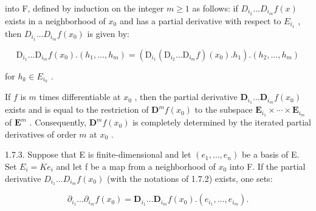 into F, defined by induction on the integer \(m \geqslant 1\) as follows: if \(D_{i_{2}} \ldots D_{i_{m}} f(x)\) exists in a neighborhood of \(x_{0}\) and has a partial derivative with respect to \(E_{i_{1}}\) , then \(D_{i_{1}} \ldots D_{i_{m}} f(x_{0})\) is given by:

\[
\mathrm{D} _ {i _ {1}} \dots \mathrm{D} _ {i _ {m}} f (x _ {0}). (h _ {1}, \dots , h _ {m}) = (\mathrm{D} _ {i _ {1}} (\mathrm{D} _ {i _ {2}} \dots \mathrm{D} _ {i _ {m}} f) (x _ {0}). h _ {1}). (h _ {2}, \dots , h _ {m})
\]

for \(h_{k} \in E_{i_{k}}\) .

If \(f\) is \(m\) times differentiable at \(x_{0}\) , then the partial derivative \(\mathbf{D}_{i_{1}}\ldots\mathbf{D}_{i_{m}}f(x_{0})\) exists and is equal to the restriction of \(\mathbf{D}^{m}f(x_{0})\) to the subspace \(\mathbf{E}_{i_{1}}\times\cdots\times\mathbf{E}_{i_{m}}\) of \(\mathbf{E}^{m}\) . Consequently, \(\mathbf{D}^{m}f(x_{0})\) is completely determined by the iterated partial derivatives of order \(m\) at \(x_{0}\) .

1.7.3. Suppose that E is finite-dimensional and let \((e_{1},\ldots,e_{n})\) be a basis of E. Set \(E_{i}=Ke_{i}\) and let f be a map from a neighborhood of \(x_{0}\) into F. If the partial derivative \(D_{i_{1}}\ldots D_{i_{m}}f(x_{0})\) (with the notations of 1.7.2) exists, one sets:

\[
\partial_ {i _ {1}} \dots \partial_ {i _ {m}} f (x _ {0}) = \mathbf {D} _ {i _ {1}} \dots \mathbf {D} _ {i _ {m}} f (x _ {0}). (e _ {i _ {1}}, \dots , e _ {i _ {m}}).
\]

